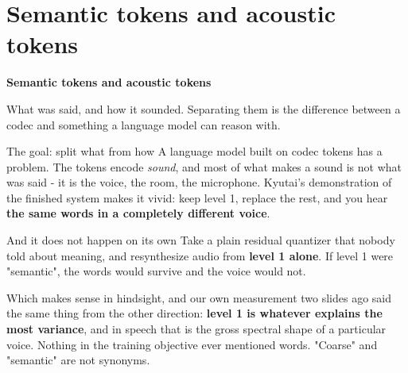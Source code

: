 \documentclass[aspectratio=169]{beamer}
\begin{document}
\section{Semantic tokens and acoustic tokens}

\begin{frame}[plain]
  \vfill
  \begin{center}
    {\Large\color{popblue}\textbf{Semantic tokens and acoustic tokens}}\\[0.9em]
    \begin{minipage}{0.82\textwidth}\centering\small
      What was said, and how it sounded. Separating them is the difference between a codec and
      something a language model can reason with.
    \end{minipage}
  \end{center}
  \vfill
\end{frame}

\begin{frame}{The goal: split what from how}
  \small
  A language model built on codec tokens has a problem. The tokens encode \emph{sound}, and most
  of what makes a sound is not what was said - it is the voice, the room, the microphone.
  \vskip 8pt
  \vskip 8pt
  Kyutai's demonstration of the finished system makes it vivid: keep level 1, replace the rest,
  and you hear \textbf{the same words in a completely different voice}.
  \vskip 8pt
  \centering
\end{frame}

\begin{frame}{And it does not happen on its own}
  \small
  Take a plain residual quantizer that nobody told about meaning, and resynthesize audio from
  \textbf{level 1 alone}. If level 1 were "semantic", the words would survive and the voice
  would not.
  \vskip 8pt
  \begin{center}
  \end{center}
  \vskip 8pt
  Which makes sense in hindsight, and our own measurement two slides ago said the same thing
  from the other direction: \textbf{level 1 is whatever explains the most variance}, and in
  speech that is the gross spectral shape of a particular voice. Nothing in the training
  objective ever mentioned words.
  \vskip 6pt
  \centering
  \footnotesize
  "Coarse" and "semantic" are not synonyms.
\end{frame}
\end{document}
